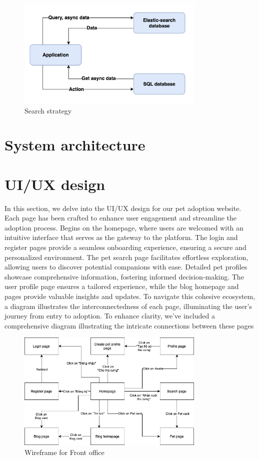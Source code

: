 \begin{figure}[H]
    \centering
    \includegraphics[width=0.8\textwidth]{Figures/search_strat.png}
    \caption{Search strategy}
\end{figure}

\section{System architecture}

\section{UI/UX design}

In this section, we delve into the UI/UX design for our pet adoption website. Each page has been crafted to enhance user engagement and streamline the adoption process. Begins on the homepage, where users are welcomed with an intuitive interface that serves as the gateway to the platform. The login and register pages provide a seamless onboarding experience, ensuring a secure and personalized environment. The pet search page facilitates effortless exploration, allowing users to discover potential companions with ease. Detailed pet profiles showcase comprehensive information, fostering informed decision-making. The user profile page ensures a tailored experience, while the blog homepage and pages provide valuable insights and updates. To navigate this cohesive ecosystem, a diagram illustrates the interconnectedness of each page, illuminating the user's journey from entry to adoption. To enhance clarity, we've included a comprehensive diagram illustrating the intricate connections between these pages

\begin{figure}[H]
    \centering
    \includegraphics[width=0.8\textwidth]{Figures/wireframe_fo.png}
    \caption{Wireframe for Front office}
\end{figure}

